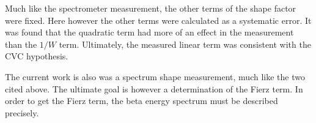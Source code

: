 \documentclass[../MaxHughesThesis.tex]{subfiles}
\begin{document}
Much like the spectrometer measurement, the other terms of the shape factor were fixed.
Here however the other terms were calculated as a systematic error.
It was found that the quadratic term had more of an effect in the measurement than the $1/W$ term.
Ultimately, the measured linear term was consistent with the CVC hypothesis. 

The current work is also was a spectrum shape measurement, much like the two cited above.
The ultimate goal is however a  determination of the Fierz term. 
In order to get the Fierz term, the beta energy spectrum must be described precisely.
\end{document}
